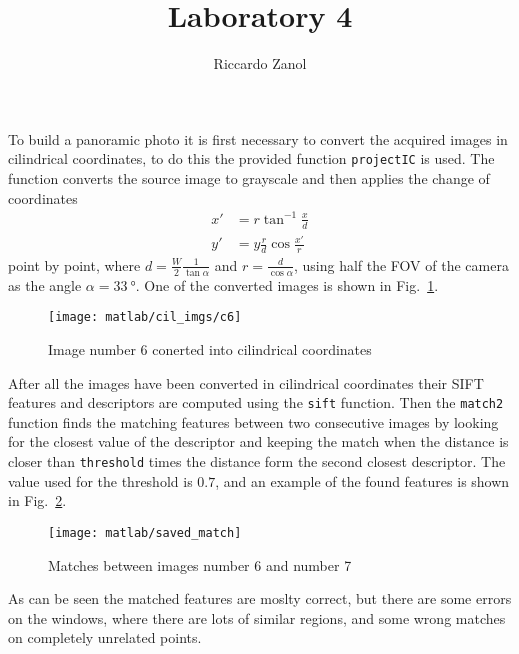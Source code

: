 \documentclass[a4paper,oneside]{article}
\author{Riccardo Zanol}
\title{Laboratory 4}
\newcommand{\inlinecode}[1]{\lstinline[basicstyle=\ttfamily,keywordstyle={},stringstyle={},commentstyle={\itshape}]{#1}}
\begin{document}
\maketitle

To build a panoramic photo it is first necessary to convert the
acquired images in cilindrical coordinates, to do this the provided
function \inlinecode{projectIC} is used. The function converts the
source image to grayscale and then applies the change of coordinates
\begin{align*}
  x' &= r\tan^{-1}\frac{x}{d} \\
  y' &= y\frac{r}{d}\cos\frac{x'}{r}
\end{align*}
point by point, where $d = \frac{W}{2}\frac{1}{\tan\alpha}$ and $r =
\frac{d}{\cos\alpha}$, using half the FOV of the camera as the angle
$\alpha = \SI{33}{\degree}$. One of the converted images is shown in
Fig.~\ref{fig:cil}.
\begin{figure}[htbp]
  \centering
  \texttt{[image: matlab/cil\_imgs/c6]}
  \caption{Image number 6 conerted into cilindrical coordinates}
  \label{fig:cil}
\end{figure}

After all the images have been converted in cilindrical coordinates
their SIFT features and descriptors are computed using the
\inlinecode{sift} function. Then the \inlinecode{match2} function
finds the matching features between two consecutive images by looking
for the closest value of the descriptor and keeping the match when the
distance is closer than \inlinecode{threshold} times the distance form
the second closest descriptor. The value used for the threshold is
$0.7$, and an example of the found features is shown in Fig.~\ref{fig:match}.
\begin{figure}[htbp]
  \centering
  \texttt{[image: matlab/saved\_match]}
  \caption{Matches between images number 6 and number 7}
  \label{fig:match}
\end{figure}
As can be seen the matched features are moslty correct, but there are
some errors on the windows, where there are lots of similar regions,
and some wrong matches on completely unrelated points.
\end{document}
